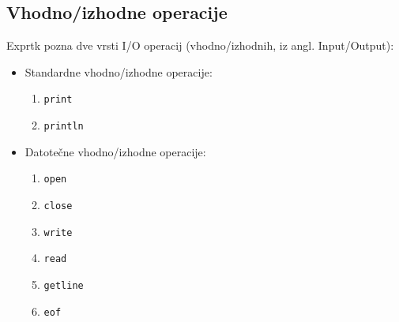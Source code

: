 \documentclass[12pt]{report}
\begin{document}
		\subsection{Vhodno/izhodne operacije}
			Exprtk pozna dve vrsti I/O operacij (vhodno/izhodnih, iz angl. Input/Output):
			\begin{itemize}
				\item Standardne vhodno/izhodne operacije:
				\begin{enumerate}
					\item \texttt{print}
					\item \texttt{println}
				\end{enumerate}
				\item Datotečne vhodno/izhodne operacije:
				\begin{multicols}{3}
				\begin{enumerate}
					\item \texttt{open}
					\item \texttt{close}
					\item \texttt{write}
					\item \texttt{read}
					\item \texttt{getline}
					\item \texttt{eof}
				\end{enumerate}
				\end{multicols}
			\end{itemize}
\end{document}
